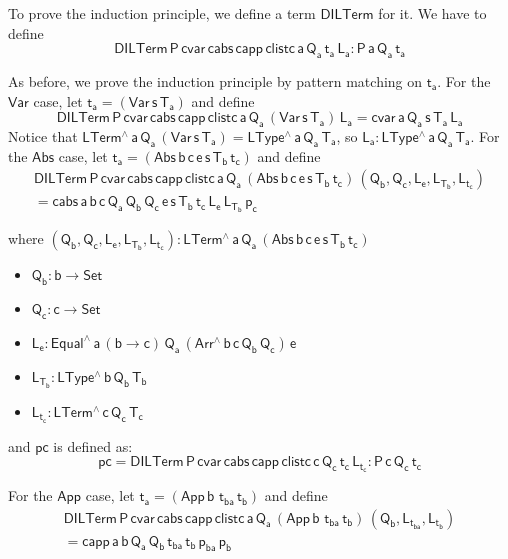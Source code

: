\documentclass[acmsmall,screen,review,anonymous]{acmart}
\theoremstyle{definition}
\begin{document}
To prove the induction principle, we define a term $\mathsf{DILTerm}$ for it. We have to define 
\[ 
\mathsf{DILTerm \, P\, cvar \, cabs\, capp\, clistc \, a\, Q_a\, t_a\, L_a : P\, a\, Q_a\, t_a}
\]

\noindent
As before, we prove the induction principle by pattern matching on $\mathsf{t_a}$. 
For the $\mathsf{Var}$ case, let $\mathsf{t_a = (Var\, s\, T_a)}$ and define
\[
  \mathsf{DILTerm \, P\, cvar \, cabs\, capp\, clistc \, a\, Q_a\, (Var\,s\,T_a) \, L_a = cvar \, a\, Q_a\, s\, T_a\, L_a }
\]
Notice that $\mathsf{LTerm^{\wedge}\, a\, Q_a\, (Var\,s\,T_a) = LType^{\wedge}\,a\,Q_a\,T_a}$, so 
$\mathsf{L_a : LType^{\wedge}\,a\,Q_a\,T_a}$.
%
For the $\mathsf{Abs}$ case, let $\mathsf{t_a = (Abs \,b \,c \, e \,s \,T_b \, t_c)} $ and define
\begin{multline*}
  \mathsf{DILTerm \, P\, cvar \, cabs\, capp\, clistc \, a\, Q_a\, (Abs \,b \,c \,e \,s \,T_b \, t_c) \, (Q_b , Q_c , L_e, L_{T_b}, L_{t_c})} \\
  \mathsf{= cabs\,a\,b\,c\, Q_a\, Q_b\, Q_c\, e\, s\, T_b\, t_c\, L_e\, L_{T_b}\, p_c}
\end{multline*}


where $\mathsf{(Q_b , Q_c , L_e, L_{T_b}, L_{t_c}) : LTerm^{\wedge}\, a\, Q_a\, (Abs \,b \,c \, e \,s \,T_b \, t_c)}$
\begin{itemize}
  \item $\mathsf{Q_b : b \to Set}$
  \item $\mathsf{Q_c : c \to Set}$
  \item $\mathsf{L_e : Equal^{\wedge} \, a\, (b \to c)\, Q_a\, (Arr^{\wedge} \, b\, c\, Q_b \, Q_c) \, e}$
  \item $\mathsf{L_{T_b}: LType^{\wedge} \, b\, Q_b\, T_b}$
  \item $\mathsf{L_{t_c}: LTerm^{\wedge} \, c\, Q_c\, T_c}$
\end{itemize}

and $\mathsf{pc}$ is defined as:
\[
  \mathsf{pc =  DILTerm\,P\,cvar\,cabs \,capp \,clistc\, c\, Q_c\, t_c\, L_{t_c}  : P \, c\, Q_c \, t_c }
\]

\noindent
For the $\mathsf{App}$ case, let $\mathsf{t_a = (App \,b \,\,t_{ba} \, t_b)} $ and define
\begin{multline*}
  \mathsf{DILTerm \, P\, cvar \, cabs\, capp\, clistc \, a\, Q_a\,  (App \,b \,\,t_{ba} \, t_b)\, (Q_b , L_{t_{ba}}, L_{t_b})} \\
  \mathsf{= capp\,a\,b\,Q_a\, Q_b\, t_{ba}\, t_b\, p_{ba} \, p_b}
\end{multline*}
\end{document}
